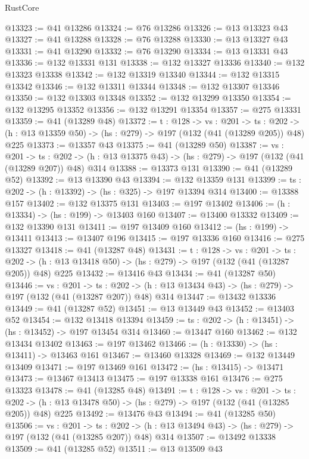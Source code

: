 \begin{lexlean}{RustCore}
\begin{coremodule}
@13323 := @41 @13286
@13324 := @76 @13286
@13326 := @13 @13323 @43
@13327 := @41 @13288
@13328 := @76 @13288
@13330 := @13 @13327 @43
@13331 := @41 @13290
@13332 := @76 @13290
@13334 := @13 @13331 @43
@13336 := @132 @13331 @131
@13338 := @132 @13327 @13336
@13340 := @132 @13323 @13338
@13342 := @132 @13319 @13340
@13344 := @132 @13315 @13342
@13346 := @132 @13311 @13344
@13348 := @132 @13307 @13346
@13350 := @132 @13303 @13348
@13352 := @132 @13299 @13350
@13354 := @132 @13295 @13352
@13356 := @132 @13291 @13354
@13357 := @275 @13331
@13359 := @41 (@13289 @48)
@13372 := {t : @128} ->
  {vs : @201} ->
  {ts : @202} -> (h : @13 @13359 @50) -> (hs : @279) -> @197 (@132 (@41 (@13289 @205)) @48) @225
@13373 := @13357 @43
@13375 := @41 (@13289 @50)
@13387 := {vs : @201} ->
  {ts : @202} -> (h : @13 @13375 @43) -> (hs : @279) -> @197 (@132 (@41 (@13289 @207)) @48) @314
@13388 := @13373 @131
@13390 := @41 (@13289 @52)
@13392 := @13 @13390 @43
@13394 := @132 @13359 @131
@13399 := {ts : @202} -> (h : @13392) -> (hs : @325) -> @197 @13394 @314
@13400 := @13388 @157
@13402 := @132 @13375 @131
@13403 := @197 @13402
@13406 := (h : @13334) -> (hs : @199) -> @13403 @160
@13407 := @13400 @13332
@13409 := @132 @13390 @131
@13411 := @197 @13409 @160
@13412 := (hs : @199) -> @13411
@13413 := @13407 @196
@13415 := @197 @13336 @160
@13416 := @275 @13327
@13418 := @41 (@13287 @48)
@13431 := {t : @128} ->
  {vs : @201} ->
  {ts : @202} -> (h : @13 @13418 @50) -> (hs : @279) -> @197 (@132 (@41 (@13287 @205)) @48) @225
@13432 := @13416 @43
@13434 := @41 (@13287 @50)
@13446 := {vs : @201} ->
  {ts : @202} -> (h : @13 @13434 @43) -> (hs : @279) -> @197 (@132 (@41 (@13287 @207)) @48) @314
@13447 := @13432 @13336
@13449 := @41 (@13287 @52)
@13451 := @13 @13449 @43
@13452 := @13403 @52
@13454 := @132 @13418 @13394
@13459 := {ts : @202} -> (h : @13451) -> (hs : @13452) -> @197 @13454 @314
@13460 := @13447 @160
@13462 := @132 @13434 @13402
@13463 := @197 @13462
@13466 := (h : @13330) -> (hs : @13411) -> @13463 @161
@13467 := @13460 @13328
@13469 := @132 @13449 @13409
@13471 := @197 @13469 @161
@13472 := (hs : @13415) -> @13471
@13473 := @13467 @13413
@13475 := @197 @13338 @161
@13476 := @275 @13323
@13478 := @41 (@13285 @48)
@13491 := {t : @128} ->
  {vs : @201} ->
  {ts : @202} -> (h : @13 @13478 @50) -> (hs : @279) -> @197 (@132 (@41 (@13285 @205)) @48) @225
@13492 := @13476 @43
@13494 := @41 (@13285 @50)
@13506 := {vs : @201} ->
  {ts : @202} -> (h : @13 @13494 @43) -> (hs : @279) -> @197 (@132 (@41 (@13285 @207)) @48) @314
@13507 := @13492 @13338
@13509 := @41 (@13285 @52)
@13511 := @13 @13509 @43

\end{coremodule}
\end{lexlean}
